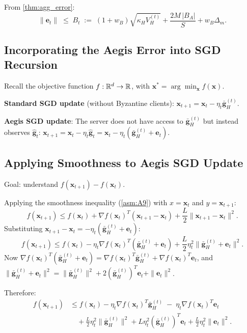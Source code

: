 \documentclass[../main]{subfiles}
\begin{document}
From \cref{thm:agg_error}:
\begin{equation}
    \boxed{\|\mathbf{e}_t\| \;\leq\; B_t
    \;:=\; (1 + w_B)\sqrt{\kappa_H V_H^{(t)}}
    + \frac{2M\,|B_A|}{S}
    + w_B \Delta_m.}
    \label{eq:Bt_def}
\end{equation}
\subsection{Incorporating the Aegis Error into SGD Recursion}

Recall the objective function $f: \mathbb{R}^d \to \mathbb{R}$, with $\mathbf{x}^* = \arg\min_{\mathbf{x}} f(\mathbf{x})$.

\textbf{Standard SGD update} (without Byzantine clients):
$\mathbf{x}_{t+1} = \mathbf{x}_t - \eta_t \bar{\mathbf{g}}_H^{(t)}$.

\textbf{Aegis SGD update}: The server does not have access to $\bar{\mathbf{g}}_H^{(t)}$
but instead observes $\hat{\mathbf{g}}_t$:
$\mathbf{x}_{t+1} = \mathbf{x}_t - \eta_t \hat{\mathbf{g}}_t = \mathbf{x}_t - \eta_t(\bar{\mathbf{g}}_H^{(t)} + \mathbf{e}_t)$.

\subsection{Applying Smoothness to Aegis SGD Update}

Goal: understand $f(\mathbf{x}_{t+1}) - f(\mathbf{x}_t)$.

Applying the smoothness inequality (\cref{asm:A9}) with $x = \mathbf{x}_t$ and $y = \mathbf{x}_{t+1}$:
\[
    f(\mathbf{x}_{t+1}) \leq f(\mathbf{x}_t) + \nabla f(\mathbf{x}_t)^T(\mathbf{x}_{t+1} - \mathbf{x}_t)
    + \frac{L}{2}\|\mathbf{x}_{t+1} - \mathbf{x}_t\|^2.
\]
Substituting $\mathbf{x}_{t+1} - \mathbf{x}_t = -\eta_t(\bar{\mathbf{g}}_H^{(t)} + \mathbf{e}_t)$:
\begin{equation}
    f(\mathbf{x}_{t+1}) \leq f(\mathbf{x}_t) - \eta_t \nabla f(\mathbf{x}_t)^T(\bar{\mathbf{g}}_H^{(t)} + \mathbf{e}_t)
    + \frac{L}{2}\eta_t^2\|\bar{\mathbf{g}}_H^{(t)} + \mathbf{e}_t\|^2.
    \label{eq:smoothness_applied}
\end{equation}
Now $\nabla f(\mathbf{x}_t)^T(\bar{\mathbf{g}}_H^{(t)} + \mathbf{e}_t) = \nabla f(\mathbf{x}_t)^T\bar{\mathbf{g}}_H^{(t)} + \nabla f(\mathbf{x}_t)^T \mathbf{e}_t$, and
$\|\bar{\mathbf{g}}_H^{(t)} + \mathbf{e}_t\|^2 = \|\bar{\mathbf{g}}_H^{(t)}\|^2 + 2(\bar{\mathbf{g}}_H^{(t)})^T \mathbf{e}_t + \|\mathbf{e}_t\|^2$.

Therefore:
\begin{align}
    f(\mathbf{x}_{t+1}) &\leq f(\mathbf{x}_t) - \eta_t \nabla f(\mathbf{x}_t)^T \bar{\mathbf{g}}_H^{(t)}
    \;-\; \eta_t \nabla f(\mathbf{x}_t)^T \mathbf{e}_t \nonumber\\
    &\quad + \frac{L}{2}\eta_t^2\|\bar{\mathbf{g}}_H^{(t)}\|^2
    + L\eta_t^2 (\bar{\mathbf{g}}_H^{(t)})^T \mathbf{e}_t
    + \frac{L}{2}\eta_t^2\|\mathbf{e}_t\|^2.
    \label{eq:full_descent}
\end{align}
\end{document}
